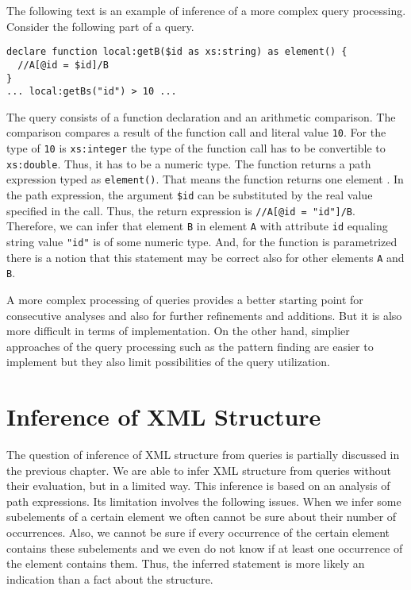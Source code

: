 The following text is an example of inference of a more complex query processing. Consider the following part of a query.
\begin{verbatim}
declare function local:getB($id as xs:string) as element() {
  //A[@id = $id]/B
}
... local:getBs("id") > 10 ...
\end{verbatim}
The query consists of a function declaration and an arithmetic comparison. The comparison compares a result of the function call and literal value \texttt{10}. For the type of \texttt{10} is \texttt{xs:integer} the type of the function call has to be convertible to \texttt{xs:double}. Thus, it has to be a numeric type. The function returns a path expression typed as \texttt{element()}. That means the function returns one element . In the path expression, the argument \texttt{\$id} can be substituted by the real value specified in the call. Thus, the return expression is \texttt{//A[@id = "id"]/B}. Therefore, we can infer that element \texttt{B} in element \texttt{A} with attribute \texttt{id} equaling string value \texttt{"id"} is of some numeric type. And, for the function is parametrized there is a notion that this statement may be correct also for other elements \texttt{A} and \texttt{B}.

A more complex processing of queries provides a better starting point for consecutive analyses and also for further refinements and additions. But it is also more difficult in terms of implementation. On the other hand, simplier approaches of the query processing such as the pattern finding are easier to implement but they also limit possibilities of the query utilization.



\section{Inference of XML Structure}
The question of inference of XML structure from queries is partially discussed in the previous chapter. We are able to infer XML structure from queries without their evaluation, but in a limited way. This inference is based on an analysis of path expressions. Its limitation involves the following issues. When we infer some subelements of a certain element we often cannot be sure about their number of occurrences. Also, we cannot be sure if every occurrence of the certain element contains these subelements and we even do not know if at least one occurrence of the element contains them. Thus, the inferred statement is more likely an indication than a fact about the structure.

